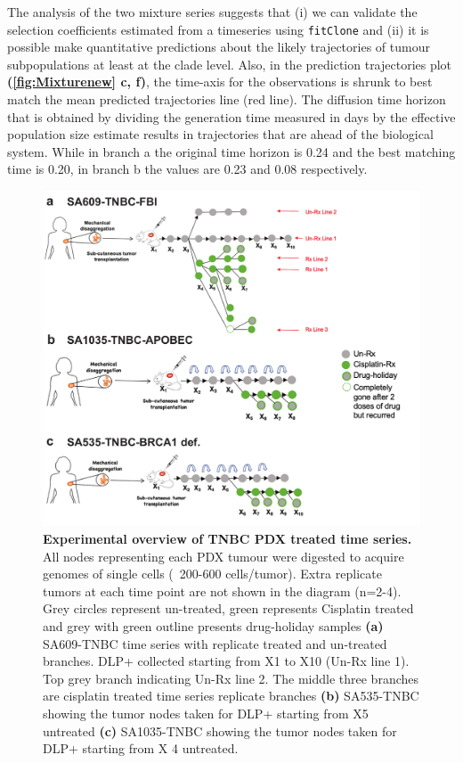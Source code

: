 The analysis of the two mixture series suggests that (i) we can validate the selection coefficients estimated from a timeseries using \texttt{fitClone} and (ii) it is possible make quantitative predictions about the likely trajectories of tumour subpopulations at least at the clade level. Also, in the prediction trajectories plot \textbf{(\autoref{fig:Mixturenew} c, f)}, the time-axis for the observations is shrunk to best match the mean predicted trajectories line (red line). The diffusion time horizon that is obtained by dividing the generation time measured in days by the effective population size estimate results in trajectories that are ahead of the biological system. While in branch a the original time horizon is 0.24 and the best matching time is 0.20, in branch b the values are 0.23 and 0.08 respectively.





\begin{figure}
\centering
\includegraphics[width=\textwidth]{Figures/treatedtimeseriesgreen.pdf}
	
\caption[Experimental overview of TNBC PDX treated time series]
	{\small
	\textbf{Experimental overview of TNBC PDX treated time series.}
	      All nodes representing each PDX tumour were digested to acquire genomes of single cells (~200-600 cells/tumor). Extra replicate tumors at each time point are not shown in the diagram (n=2-4). Grey circles represent un-treated, green represents Cisplatin treated and grey with green outline presents drug-holiday samples \textbf{(a)} SA609-TNBC time series with replicate treated and un-treated branches. DLP+ collected starting from X1 to X10 (Un-Rx line 1). Top grey branch indicating Un-Rx line 2. The middle three branches are cisplatin treated time series replicate branches \textbf{(b)} SA535-TNBC  showing the tumor nodes taken for DLP+ starting from X5 untreated \textbf{(c)} SA1035-TNBC  showing the tumor nodes taken for DLP+ starting from X 4 untreated.}
	
	\label{fig:treatedtimeseriesgreen}
\end{figure}


